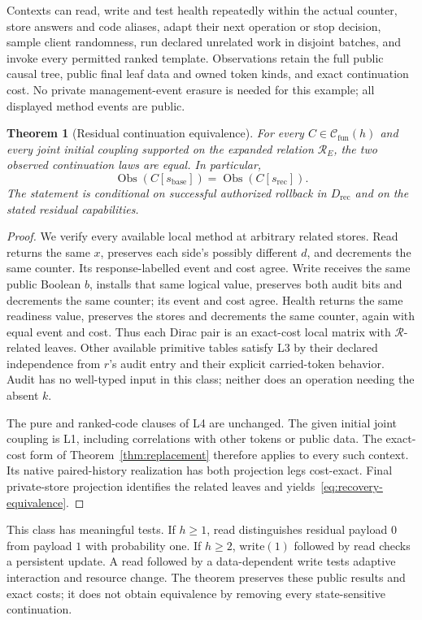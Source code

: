 \documentclass[11pt,a4paper]{article}
\newtheorem{theorem}{Theorem}[section]
\theoremstyle{definition}
\newcommand{\Obs}{\operatorname{Obs}}
\begin{document}
Contexts can read, write and test health repeatedly within the actual
counter, store answers and code aliases, adapt their next operation or
stop decision, sample client randomness, run declared unrelated work in
disjoint batches, and invoke every permitted ranked template. Observations
retain the full public causal tree, public final leaf data and owned token
kinds, and exact continuation cost. No private management-event erasure
is needed for this example; all displayed method events are public.

\begin{theorem}[Residual continuation equivalence]\label{thm:recovery}
For every $C\in\mathcal C_{\mathrm{fun}}(h)$ and every joint initial
coupling supported on the expanded relation $\mathcal R_E$, the two
observed continuation laws are equal. In particular,
\begin{equation}\label{eq:recovery-equivalence}
 \Obs(C[s_{\mathrm{base}}])=\Obs(C[s_{\mathrm{rec}}]).
\end{equation}
The statement is conditional on successful authorized rollback in
$D_{\mathrm{rec}}$ and on the stated residual capabilities.
\end{theorem}
\begin{proof}
We verify every available local method at arbitrary related stores.
Read returns the same $x$, preserves each side's possibly different
$d$, and decrements the same counter. Its response-labelled event and
cost agree. Write receives the same public Boolean $b$, installs that
same logical value, preserves both audit bits and decrements the same
counter; its event and cost agree. Health returns the same readiness
value, preserves the stores and decrements the same counter, again with
equal event and cost. Thus each Dirac pair is an exact-cost local
matrix with $\mathcal R$-related leaves. Other available primitive tables
satisfy L3 by their declared independence from $r$'s audit entry and their
explicit carried-token behavior. Audit has no well-typed input in this
class; neither does an operation needing the absent $k$.

The pure and ranked-code clauses of L4 are unchanged. The given initial
joint coupling is L1, including correlations with other tokens or public
data. The exact-cost form of Theorem~\ref{thm:replacement} therefore
applies to every such context. Its native paired-history realization has
both projection legs cost-exact. Final private-store projection identifies
the related leaves and yields~\eqref{eq:recovery-equivalence}.
\end{proof}
This class has meaningful tests. If $h\ge1$, read distinguishes residual
payload $0$ from payload $1$ with probability one. If $h\ge2$,
write$(1)$ followed by read checks a persistent update. A read followed
by a data-dependent write tests adaptive interaction and resource change.
The theorem preserves these public results and exact costs; it does not
obtain equivalence by removing every state-sensitive continuation.
\end{document}
